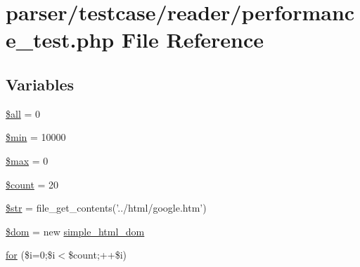 \hypertarget{reader_2performance__test_8php}{\section{parser/testcase/reader/performance\+\_\+test.php File Reference}
\label{reader_2performance__test_8php}
}
\subsection*{Variables}
\begin{DoxyCompactItemize}
\item 
\hyperlink{reader_2performance__test_8php_a3c74ea9d2348c9aba28d36e692bef2d2}{\$all} = 0
\item 
\hyperlink{reader_2performance__test_8php_a56ba76399d12529c48ecea581ecd08cf}{\$min} = 10000
\item 
\hyperlink{reader_2performance__test_8php_a9fb747ef5633c244639185a7fe54f6b0}{\$max} = 0
\item 
\hyperlink{reader_2performance__test_8php_af789423037bbc89dc7c850e761177570}{\$count} = 20
\item 
\hyperlink{reader_2performance__test_8php_a7542d95618011800c61773127fa625cf}{\$str} = file\+\_\+get\+\_\+contents('../html/google.\+htm')
\item 
\hyperlink{reader_2performance__test_8php_a46127a794280dd592812c25b62af34b0}{\$dom} = new \hyperlink{classsimple__html__dom}{simple\+\_\+html\+\_\+dom}
\item 
\hyperlink{reader_2performance__test_8php_a1ad16f46bd60e417fc5900f5bbdd88ac}{for} (\$i=0;\$i$<$\$count;++\$i)
\end{DoxyCompactItemize}


